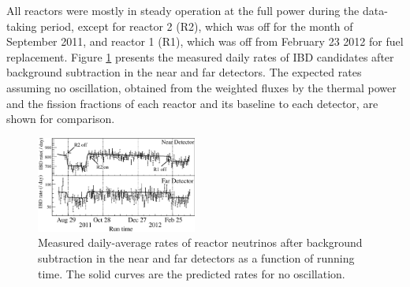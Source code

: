 \documentclass[aps,prl,twocolumn,superscriptaddress,showpacs]{revtex4-1}
\begin{document}
All reactors were mostly in steady operation at the full power during the data-taking period, except for reactor 2 (R2), which was off for the month of September 2011, and reactor 1 (R1), which was off from February 23 2012 for fuel replacement. Figure \ref{fig:daily-neutrino-rate} presents the measured daily rates of IBD candidates after background subtraction in the near and far detectors. The expected rates assuming no oscillation, obtained from the weighted fluxes by the thermal power and the fission fractions of each reactor and its baseline to each detector, are shown for comparison.
\begin{figure}[hbt]
\begin{center}
\includegraphics[width=0.47\textwidth]{daily-neutrino-rate.eps}
\caption{Measured daily-average rates of reactor neutrinos after background subtraction in the near and far detectors as a function of running time. The solid curves are the predicted rates for no oscillation.}
\label{fig:daily-neutrino-rate}
\end{center}
\end{figure}
\end{document}
